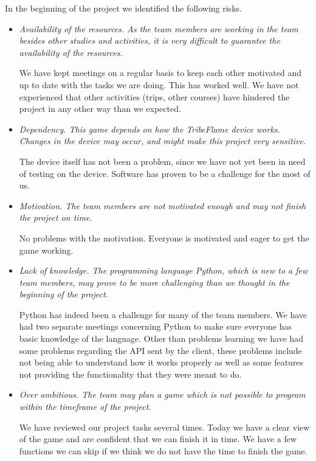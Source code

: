 \documentclass[12pt,a4paper]{article}
\begin{document}
In the beginning of the project we identified the following risks.

\begin{itemize}
\item \textit{Availability of the resources. As the team members are working in the team besides other studies and activities, it is very difficult to guarantee the availability of the resources.}

We have kept meetings on a regular basis to keep each other motivated and up to date with the tasks we are doing. This has worked well. We have not experienced that other activities (trips, other courses) have hindered the project in any other way than we expected.
\item \textit{Dependency. This game depends on how the TribeFlame device works. Changes in the device may occur, and might make this project very sensitive.}

The device itself has not been a problem, since we have not yet been in need of testing on the device. Software has proven to be a challenge for the most of us.

\item \textit{Motivation. The team members are not motivated enough and may not finish the project on time.}

No problems with the motivation. Everyone is motivated and eager to get the game working.

\item \textit{Lack of knowledge. The programming language Python, which is new to a few team members, may prove to be more challenging than we thought in the beginning of the project.}

Python has indeed been a challenge for many of the team members. We have had two separate meetings concerning Python to make sure everyone has basic knowledge of the language. Other than problems learning we have had some problems regarding the API sent by the client, these problems include not being able to understand how it works properly as well as some features not providing the functionality that they were meant to do.

\item \textit{Over ambitious. The team may plan a game which is not possible to program within the timeframe of the project.}

We have reviewed our project tasks several times. Today we have a clear view of the game and are confident that we can finish it in time. We have a few functions we can skip if we think we do not have the time to finish the game.


\end{itemize}
\end{document}
